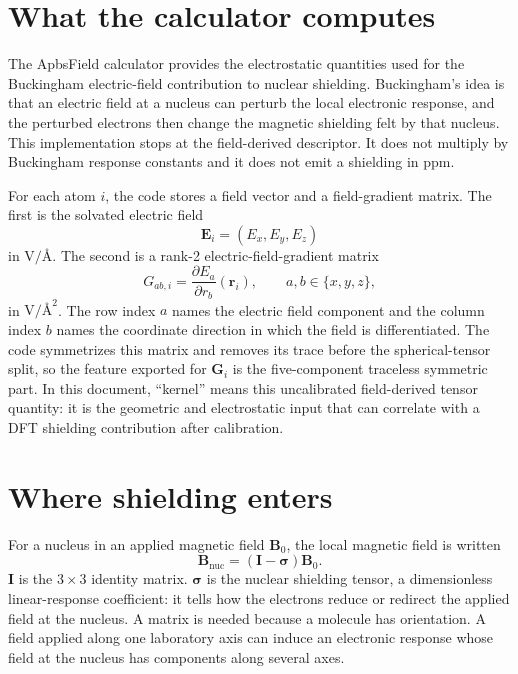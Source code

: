 \documentclass[11pt]{article}
\begin{document}

\section{What the calculator computes}

The ApbsField calculator provides the electrostatic quantities used for the
Buckingham electric-field contribution to nuclear shielding. Buckingham's idea
is that an electric field at a nucleus can perturb the local electronic
response, and the perturbed electrons then change the magnetic shielding felt by
that nucleus. This implementation stops at the field-derived descriptor. It
does not multiply by Buckingham response constants and it does not emit a
shielding in ppm.

For each atom \(i\), the code stores a field vector and a field-gradient
matrix. The first is the solvated electric field
\begin{equation}
  \bm E_i = (E_x,E_y,E_z)
\end{equation}
in \(\si{\volt\per\angstrom}\). The second is a rank-2 electric-field-gradient
matrix
\begin{equation}
  G_{ab,i} = \frac{\partial E_a}{\partial r_b}(\bm r_i),
  \qquad a,b\in\{x,y,z\},
  \label{eq:g-def}
\end{equation}
in \(\si{\volt\per\angstrom\squared}\). The row index \(a\) names the electric
field component and the column index \(b\) names the coordinate direction in
which the field is differentiated. The code symmetrizes this matrix and removes
its trace before the spherical-tensor split, so the feature exported for
\(\bm G_i\) is the five-component traceless symmetric part. In this document,
``kernel'' means this uncalibrated field-derived tensor quantity: it is the
geometric and electrostatic input that can correlate with a DFT shielding
contribution after calibration.

\section{Where shielding enters}

For a nucleus in an applied magnetic field \(\bm B_0\), the local magnetic field
is written
\begin{equation}
  \bm B_{\mathrm{nuc}} = (\bm I-\bm\sigma)\bm B_0 .
  \label{eq:shielding}
\end{equation}
\(\bm I\) is the \(3\times3\) identity matrix. \(\bm\sigma\) is the nuclear
shielding tensor, a dimensionless linear-response coefficient: it tells how the
electrons reduce or redirect the applied field at the nucleus. A matrix is
needed because a molecule has orientation. A field applied along one laboratory
axis can induce an electronic response whose field at the nucleus has
components along several axes.
\end{document}
